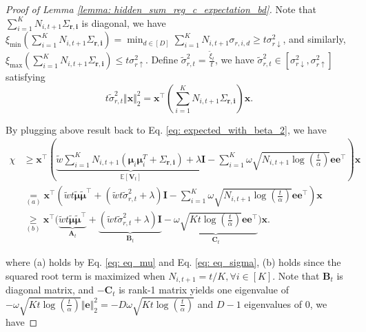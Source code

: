 \begin{proof}[Proof of Lemma \ref{lemma: hidden_sum_reg_c_expectation_bd}]
Note that $\sum_{i=1}^{K} N_{i,t+1} \Sigma_{\boldsymbol{r,i}}$ is diagonal, we have $\xi_{\min} ( \sum_{i=1}^{K} N_{i,t+1} \Sigma_{\boldsymbol{r,i}} ) = \min_{d \in [D]} \sum_{i=1}^{K} N_{i,t+1} \sigma_{r,i,d} \geq t \sigma^2_{r \downarrow}$, and similarly, $\xi_{\max} ( \sum_{i=1}^{K} N_{i,t+1} \Sigma_{\boldsymbol{r,i}} ) \leq t \sigma^2_{r \uparrow}$.
Define $\tilde{\sigma}^2_{r,t} = \frac{\tilde{\xi}_t}{t}$,
we have $\tilde{\sigma}^2_{r,t} \in [\sigma^2_{r \downarrow},\sigma^2_{r \uparrow}]$ satisfying 
\begin{equation}
\label{eq: eq_sigma}
t \tilde{\sigma}^2_{r,t} \Vert \boldsymbol{x} \Vert_2^2
=
\boldsymbol{x}^{\top}
\left( \sum_{i=1}^{K} N_{i,t+1} \Sigma_{\boldsymbol{r,i}} \right)
\boldsymbol{x}.
\end{equation}


By plugging above result back to Eq. \ref{eq: expected_with_beta_2}, we have
\begin{equation}
\begin{aligned}
\label{eq: expected_with_beta2}
\chi
& \geq
\boldsymbol{x}^{\top} 
\left( 
\underbrace{
\tilde{w}
\sum_{i=1}^{K} N_{i,t+1} \left(
 \boldsymbol{\mu}_{i} \boldsymbol{\mu}_{i}^T + \Sigma_{\boldsymbol{r,i}} \right)
+ \lambda \boldsymbol{I}
}_{\mathbb{E}[\boldsymbol{V}_t] }
-
\sum_{i=1}^{K} \omega \sqrt{ N_{i,t+1} \log \left( \frac{t}{\alpha} \right)} \boldsymbol{e e}^{\top}
\right)
\boldsymbol{x} \\
& \underset{(a)}{=}
\boldsymbol{x}^{\top} 
\left( 
\tilde{w} t \boldsymbol{\tilde{\mu}} \boldsymbol{\tilde{\mu}}^{\top} + \left( \tilde{w} t \tilde{\sigma}^2_{r,t} + \lambda \right) \boldsymbol{I}
-
\sum_{i=1}^{K} \omega \sqrt{ N_{i,t+1} \log \left( \frac{t}{\alpha} \right)} \boldsymbol{e e}^{\top}
\right)
\boldsymbol{x} \\
& \underset{(b)}{\geq}
\boldsymbol{x}^{\top} 
\bigg (
\underbrace{
\tilde{w} t \boldsymbol{\tilde{\mu}} \boldsymbol{\tilde{\mu}}^{\top} 
}_{\boldsymbol{A}_t}
+ 
\underbrace{
\left( \tilde{w} t \tilde{\sigma}^2_{r,t} + \lambda \right) \boldsymbol{I}
}_{\boldsymbol{B}_t}
-
\underbrace{
\omega \sqrt{ K t \log \left( \frac{t}{\alpha} \right)} \boldsymbol{e e}^{\top}
}_{\boldsymbol{C}_t}
\bigg )
\boldsymbol{x}.
\end{aligned}
\end{equation}

where (a) holds by Eq. \ref{eq: eq_mu} and Eq. \ref{eq: eq_sigma}, (b) holds since the squared root term is maximized when $N_{i,t+1} = t/K, \forall i \in [K]$.
Note that $\boldsymbol{B}_t$ is diagonal matrix, and $-\boldsymbol{C}_t$ is rank-1 matrix yields one eigenvalue of $- \omega \sqrt{ K t \log \left( \frac{t}{\alpha} \right)} \Vert \boldsymbol{e} \Vert_2^2 = -D \omega \sqrt{ K t \log \left( \frac{t}{\alpha} \right)}$ and $D-1$ eigenvalues of 0, we have 


\end{proof}

